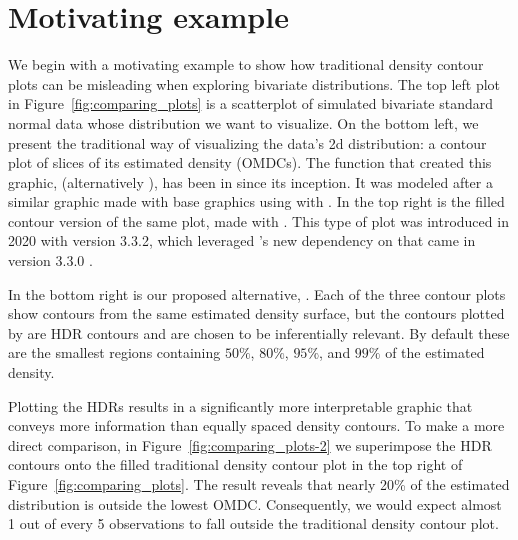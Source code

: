 \section{Motivating example}\label{sec:example}

We begin with a motivating example to show how traditional density contour plots can be misleading when exploring bivariate distributions.
The top left plot in Figure~\ref{fig:comparing_plots} is a scatterplot of simulated bivariate standard normal data whose distribution we want to visualize.
On the bottom left, we present the traditional way of visualizing the data's 2d distribution: a contour plot of slices of its estimated density (OMDCs).
The function that created this graphic,  (alternatively ), has been in  since its inception.
It was modeled after a similar graphic made with base graphics using  with .
In the top right is the filled contour version of the same plot, made with .
This type of plot was introduced in 2020 with  version 3.3.2, which leveraged 's new dependency on  that came in  version 3.3.0 \citep{isoband}.


In the bottom right is our proposed alternative, .
Each of the three contour plots show contours from the same estimated density surface, but the contours plotted by  are HDR contours and are chosen to be inferentially relevant.
By default these are the smallest regions containing $50\%$, $80\%$, $95\%$, and $99\%$ of the estimated density.

Plotting the HDRs results in a significantly more interpretable graphic that conveys more information than equally spaced density contours.
To make a more direct comparison, in Figure~\ref{fig:comparing_plots-2} we superimpose the HDR contours onto the filled traditional density contour plot in the top right of Figure~\ref{fig:comparing_plots}.
The result reveals that nearly 20\% of the estimated distribution is outside the lowest OMDC.
Consequently, we would expect almost 1 out of every 5 observations to fall outside the traditional density contour plot.

